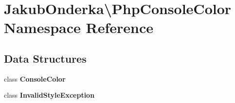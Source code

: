 \section{Jakub\+Onderka\textbackslash{}Php\+Console\+Color Namespace Reference}
\label{namespace_jakub_onderka_1_1_php_console_color}
\subsection*{Data Structures}
\begin{DoxyCompactItemize}
\item 
class {\bf Console\+Color}
\item 
class {\bf Invalid\+Style\+Exception}
\end{DoxyCompactItemize}
